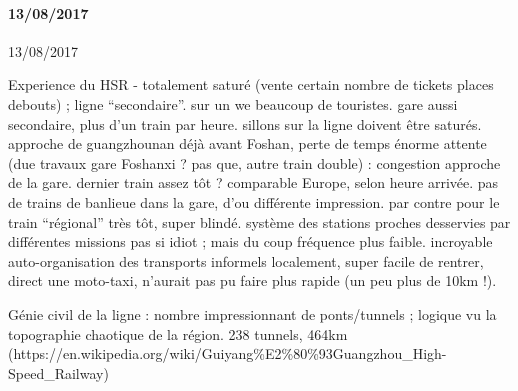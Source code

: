 \paragraph{13/08/2017}{13/08/2017}

Experience du HSR - totalement saturé (vente certain nombre de tickets places debouts) ; ligne ``secondaire''. sur un we beaucoup de touristes. gare aussi secondaire, plus d'un train par heure. sillons sur la ligne doivent être saturés. approche de guangzhounan déjà avant Foshan, perte de temps énorme attente (due travaux gare Foshanxi ? pas que, autre train double) : congestion approche de la gare. dernier train assez tôt ? comparable Europe, selon heure arrivée. pas de trains de banlieue dans la gare, d'ou différente impression. par contre pour le train ``régional'' très tôt, super blindé. système des stations proches desservies par différentes missions pas si idiot ; mais du coup fréquence plus faible. incroyable auto-organisation des transports informels localement, super facile de rentrer, direct une moto-taxi, n'aurait pas pu faire plus rapide (un peu plus de 10km !).

Génie civil de la ligne : nombre impressionnant de ponts/tunnels ; logique vu la topographie chaotique de la région. 238 tunnels, 464km (https://en.wikipedia.org/wiki/Guiyang{\%}E2{\%}80{\%}93Guangzhou_High-Speed_Railway)















